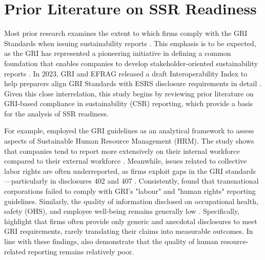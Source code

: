 \section{Prior Literature on SSR Readiness}

Most prior research examines the extent to which firms comply with the GRI Standards 
when issuing sustainability reports \parencite{Fonseca2014, Vigneau2015}. 
This emphasis is to be expected, as the GRI has represented a pioneering initiative 
in defining a common foundation that enables companies to develop stakeholder-oriented 
sustainability reports \parencite{Carungu2025, Dumay2010}. In 2023, GRI and EFRAG released a draft 
Interoperability Index to help preparers align GRI Standards with ESRS disclosure 
requirements in detail \parencite{GRIEFRAG2024}. Given this close interrelation, this study begins 
by reviewing prior literature on GRI-based compliance in sustainability (CSR) reporting, 
which provide a basis for the analysis of SSR readiness.

For example, \textcite{Ehnert2016} employed the GRI guidelines as an analytical framework 
to assess aspects of Sustainable Human Resource Management (HRM). The study shows that 
companies tend to report more extensively on their internal workforce compared to their 
external workforce \parencite{Ehnert2016}. Meanwhile, issues related to collective labor 
rights are often underreported, as firms exploit gaps in the GRI standards—particularly 
in disclosures 402 and 407 \parencite{Waas2021}. Consistently, \textcite{Parsa2018} found 
that transnational corporations failed to comply with GRI's "labour" and "human rights"
reporting guidelines. Similarly, the quality of information disclosed on occupational 
health, safety (OHS), and employee well-being remains generally low \parencite{Mariappanadar2022}. 
Specifically, \textcite{Mariappanadar2022} highlight that firms often provide only generic and 
anecdotal disclosures to meet GRI requirements, rarely translating their claims into measurable
outcomes. In line with these findings, \textcite{Chauvey2015} also demonstrate that the quality
of human resource-related reporting remains relatively poor.


